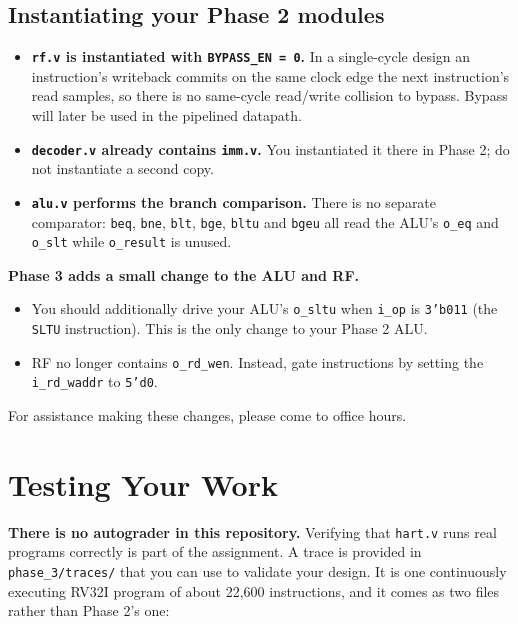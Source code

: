 \documentclass[11pt]{article}
\begin{document}
\subsection{Instantiating your Phase 2 modules}
\label{sec:instantiate}
\begin{itemize}
  \item \textbf{\texttt{rf.v} is instantiated with \texttt{BYPASS\_EN = 0}.}
        In a single-cycle design an instruction's writeback commits on the
        same clock edge the next instruction's read samples, so there is no
        same-cycle read/write collision to bypass. Bypass will later be used in the pipelined datapath.
  \item \textbf{\texttt{decoder.v} already contains \texttt{imm.v}.} You
        instantiated it there in Phase 2; do not instantiate a second copy.
  \item \textbf{\texttt{alu.v} performs the branch comparison.} There is no
        separate comparator: \texttt{beq}, \texttt{bne}, \texttt{blt},
        \texttt{bge}, \texttt{bltu} and \texttt{bgeu} all read the ALU's
        \texttt{o\_eq} and \texttt{o\_slt} while \texttt{o\_result} is unused.
\end{itemize}

\begin{important}
\textbf{Phase 3 adds a small change to the ALU and RF.} 
\begin{itemize}
  \item You should additionally drive your ALU's \texttt{o\_sltu} when \texttt{i\_op} is \texttt{3'b011} (the \texttt{SLTU} instruction). This is the only change to your Phase 2 ALU.
  \item RF no longer contains \texttt{o\_rd\_wen}. Instead, gate instructions by setting the \texttt{i\_rd\_waddr} to \texttt{5'd0}.
\end{itemize}
For assistance making these changes, please come to office hours.
\end{important}

\newpage

\section{Testing Your Work}
\label{sec:testing}
\textbf{There is no autograder in this repository.} Verifying that
\texttt{hart.v} runs real programs correctly is part of the assignment. A
trace is provided in \texttt{phase\_3/traces/} that you can use to validate
your design. It is one continuously executing RV32I program of about
22{,}600 instructions, and it comes as two files rather than Phase 2's one:
\end{document}
